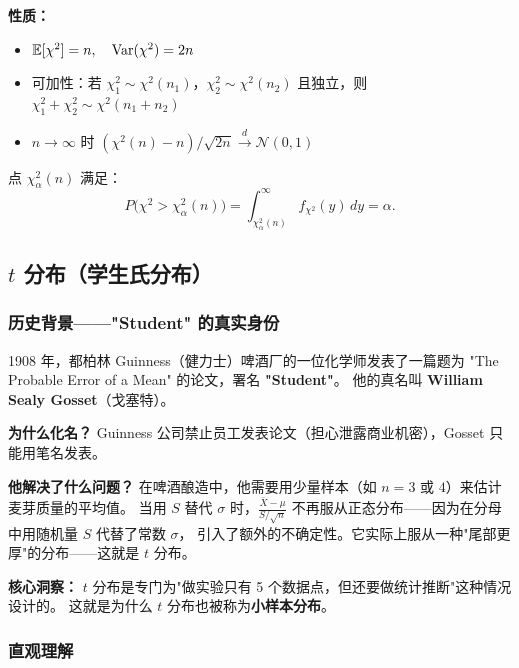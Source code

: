 \textbf{性质：}
\begin{itemize}
    \item $\mathbb{E}[\chi^2] = n,\quad \mathrm{Var}(\chi^2) = 2n$
    \item 可加性：若 $\chi_1^2 \sim \chi^2(n_1)$，$\chi_2^2 \sim \chi^2(n_2)$ 且独立，则 $\chi_1^2 + \chi_2^2 \sim \chi^2(n_1 + n_2)$
    \item $n \to \infty$ 时 $(\chi^2(n) - n)/\sqrt{2n} \xrightarrow{d} \mathcal{N}(0,1)$
\end{itemize}

\begin{definition}
点 $\chi^2_{\alpha}(n)$ 满足：
\begin{equation}
    P\big(\chi^2 > \chi^2_{\alpha}(n)\big) = \int_{\chi^2_{\alpha}(n)}^{\infty} f_{\chi^2}(y)\,dy = \alpha.
\end{equation}
\end{definition}

\subsection{$t$ 分布（学生氏分布）}

\subsubsection{历史背景——"Student" 的真实身份}

1908 年，都柏林 Guinness（健力士）啤酒厂的一位化学师发表了一篇题为
"The Probable Error of a Mean" 的论文，署名 \textbf{"Student"}。
他的真名叫 \textbf{William Sealy Gosset}（戈塞特）。

\textbf{为什么化名？} Guinness 公司禁止员工发表论文（担心泄露商业机密），Gosset 只能用笔名发表。

\textbf{他解决了什么问题？} 在啤酒酿造中，他需要用少量样本（如 $n = 3$ 或 $4$）来估计麦芽质量的平均值。
当用 $S$ 替代 $\sigma$ 时，$\frac{\bar{X} - \mu}{S/\sqrt{n}}$ 不再服从正态分布——因为在分母中用随机量 $S$ 代替了常数 $\sigma$，
引入了额外的不确定性。它实际上服从一种"尾部更厚"的分布——这就是 $t$ 分布。

\textbf{核心洞察：} $t$ 分布是专门为"做实验只有 5 个数据点，但还要做统计推断"这种情况设计的。
这就是为什么 $t$ 分布也被称为\textbf{小样本分布}。

\subsubsection{直观理解}

